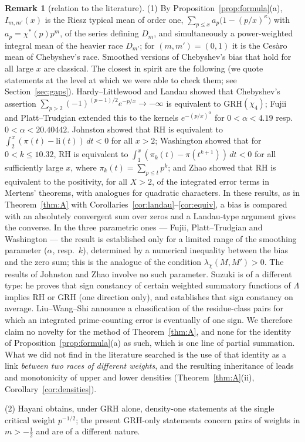 \documentclass[11pt]{amsart}
\theoremstyle{definition}
\newtheorem{remark}[theorem]{Remark}
\numberwithin{equation}{section}
\begin{document}
\begin{remark}[relation to the literature]\label{rem:literature}
(1) By Proposition~\ref{prop:formula}(a), $I_{m,m'}(x)$ is the Riesz
typical mean of order one,
$\sum_{p\le x}a_p\bigl(1-(p/x)^\kappa\bigr)$ with $a_p=\chi^*(p)p^m$,
of the series defining $D_m$, and simultaneously a power-weighted
integral mean of the heavier race $D_{m'}$; for $(m,m')=(0,1)$ it is
the Ces\`aro mean of Chebyshev's race. Smoothed versions of
Chebyshev's bias that hold for all large $x$ are classical. The
closest in spirit are the following (we quote statements at the level
at which we were able to check them; see Section~\ref{sec:gaps}).
Hardy--Littlewood and Landau \cite{HL18,Lan18} showed that Chebyshev's
assertion $\sum_{p>2}(-1)^{(p-1)/2}e^{-p/x}\to-\infty$ is equivalent
to GRH$(\chi_4)$; Fujii \cite{Fuj88} and Platt--Trudgian \cite{PT19}
extended this to the kernels $e^{-(p/x)^\alpha}$ for
$0<\alpha<4.19$ resp.\ $0<\alpha<20.40442$. Johnston \cite{Joh23}
showed that RH is equivalent to $\int_2^x(\pi(t)-\mathrm{li}(t))\,dt<0$
for all $x>2$; Washington \cite[Theorem~3]{Was24} showed that for
$0<k\le10.32$, RH is equivalent to
$\int_1^x(\pi_k(t)-\pi(t^{k+1}))\,dt<0$ for all sufficiently large
$x$, where $\pi_k(t)=\sum_{p\le t}p^k$; and Zhao \cite{Zhao25} showed
that RH is equivalent to the positivity, for all $X>2$, of the
integrated error terms in Mertens' theorems, with analogues for
quadratic characters. In these results, as in Theorem~\ref{thm:A}
with Corollaries~\ref{cor:landau}--\ref{cor:equiv}, a bias is
compared with an absolutely convergent sum over zeros and a
Landau-type argument gives the converse. In the three parametric
ones --- Fujii, Platt--Trudgian and Washington --- the result is
established only for a limited range of the smoothing parameter
($\alpha$, resp.\ $k$), determined by a numerical inequality between
the bias and the zero sum; this is the analogue of the condition
$\lambda_\chi(M,M')>0$. The results of Johnston and Zhao involve no
such parameter. Suzuki \cite{Suz25} is of a different type: he proves
that sign constancy of certain weighted summatory functions of
$\Lambda$ implies RH or GRH (one direction only), and establishes
that sign constancy on average. Liu--Wang--Shi \cite{LWS26} announce
a classification of the residue-class pairs for which an integrated
prime-counting error is eventually of one sign. We therefore claim no
novelty for the method of Theorem~\ref{thm:A}, and none for the
identity of Proposition~\ref{prop:formula}(a) as such, which is one
line of partial summation. What we did not find in the literature
searched is the use of that identity as a link \emph{between two
races of different weights}, and the resulting inheritance of leads
and monotonicity of upper and lower densities
(Theorem~\ref{thm:A}(ii), Corollary~\ref{cor:densities}).

(2) Hayani \cite{Hay25} obtains, under GRH alone, density-one
statements at the single critical weight $p^{-1/2}$; the present
GRH-only statements concern pairs of weights in $m>-\tfrac12$ and are
of a different nature.
\end{remark}
\end{document}
